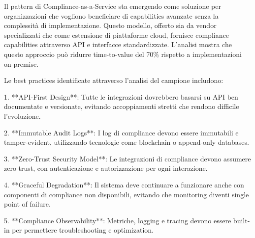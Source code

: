 Il pattern di Compliance-as-a-Service sta emergendo come soluzione per organizzazioni che vogliono beneficiare di capabilities avanzate senza la complessità di implementazione. Questo modello, offerto sia da vendor specializzati che come estensione di piattaforme cloud, fornisce compliance capabilities attraverso API e interfacce standardizzate. L'analisi mostra che questo approccio può ridurre time-to-value del 70\% rispetto a implementazioni on-premise.

Le best practices identificate attraverso l'analisi del campione includono:

1. **API-First Design**: Tutte le integrazioni dovrebbero basarsi su API ben documentate e versionate, evitando accoppiamenti stretti che rendono difficile l'evoluzione.

2. **Immutable Audit Logs**: I log di compliance devono essere immutabili e tamper-evident, utilizzando tecnologie come blockchain o append-only databases.

3. **Zero-Trust Security Model**: Le integrazioni di compliance devono assumere zero trust, con autenticazione e autorizzazione per ogni interazione.

4. **Graceful Degradation**: Il sistema deve continuare a funzionare anche con componenti di compliance non disponibili, evitando che monitoring diventi single point of failure.

5. **Compliance Observability**: Metriche, logging e tracing devono essere built-in per permettere troubleshooting e optimization.

